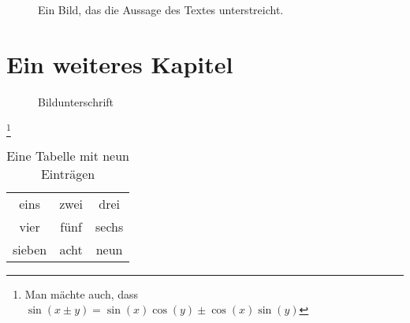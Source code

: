 
\blinddocument
{}

\begin{figure}[h]
  \centering
  \caption{Ein Bild, das die Aussage des Textes unterstreicht.}
  \label{fig:statement}					%
\end{figure}


\chapter{Ein weiteres Kapitel}

\begin{figure}[h]
\caption{Bildunterschrift}
\label{fig:introduction}					%
\end{figure}

\Blindtext
\footnote{Man mächte auch, dass $\sin(x\pm y) = \sin(x)\cos(y) \pm \cos(x)\sin(y)$}

\begin{table}[h]
  \centering
  \begin{tabular}{ccc}
  \toprule
  eins & zwei & drei\\
  vier & fünf & sechs\\
  sieben & acht & neun\\
  \bottomrule
  \end{tabular}
  \caption{Eine Tabelle mit neun Einträgen}
  \label{tab:zahltable}					%
\end{table}
